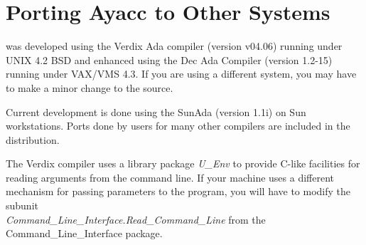 \section{Porting Ayacc to Other Systems}


\ayacc was developed using the Verdix Ada compiler (version v04.06) 
running under UNIX 4.2 BSD and enhanced using the Dec Ada Compiler
(version 1.2-15) running under VAX/VMS 4.3.  If you are using a different
system, you may have to make a minor change to the \ayacc source.

Current \ayacc development is done using the SunAda (version 1.1i) on
Sun workstations.  Ports done by users for many other compilers are
included in the distribution.

\vspace{0.25in}

The Verdix compiler uses a
library package {\it U\_Env}
to provide C-like facilities for reading arguments from the command
line.  If your machine uses a different mechanism for passing parameters to
the program, you will have to modify the subunit\\
{\it Command\_Line\_Interface.Read\_Command\_Line}
from the Command\_Line\_Interface package.

